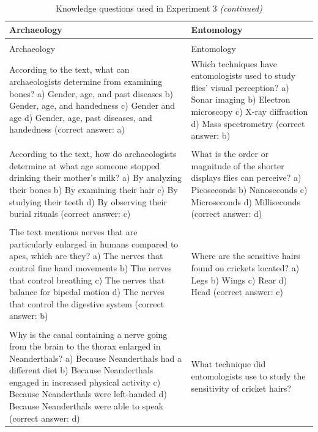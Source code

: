 \documentclass[
  english,
  doc,floatsintext]{apa6}
\begin{document}
\begin{longtable}[t]{>{\raggedright\arraybackslash}p{25em}|>{\raggedright\arraybackslash}p{25em}}
\caption{\label{tab:exp2b-knowledge}Knowledge questions used in Experiment 3}\\
\toprule
Archaeology & Entomology\\
\midrule
\endfirsthead
\caption[]{\label{tab:exp2b-knowledge}Knowledge questions used in Experiment 3 \textit{(continued)}}\\
\toprule
Archaeology & Entomology\\
\midrule
\endhead

\endfoot
\bottomrule
\endlastfoot
According to the text, what can archaeologists determine from examining bones? 
a) Gender, age, and past diseases 
b) Gender, age, and handedness
c) Gender and age
d) Gender, age, past diseases, and handedness
(correct answer: a) & Which techniques have entomologists used to study flies' visual perception?
a) Sonar imaging
b) Electron microscopy 
c) X-ray diffraction 
d) Mass spectrometry
(correct answer: b)\\
 \vphantom{3} \vphantom{2} \vphantom{1} & \\
According to the text, how do archaeologists determine at what age someone stopped drinking their mother’s milk?
a) By analyzing their bones 
b) By examining their hair 
c) By studying their teeth 
d) By observing their burial rituals
(correct answer: c) & What is the order or magnitude of the shorter displays flies can perceive?
a) Picoseconds
b) Nanoseconds
c) Microseconds
d) Milliseconds
(correct answer: d)\\
 & \\
The text mentions nerves that are particularly enlarged in humans compared to apes, which are they? 
a) The nerves that control fine hand movements
b) The nerves that control breathing
c) The nerves that balance for bipedal motion
d) The nerves that control the digestive system
(correct answer: b) & Where are the sensitive hairs found on crickets located?
a) Legs  
b) Wings  
c) Rear  
d) Head  
(correct answer: \vphantom{1} c)\\
\addlinespace
 & \\
Why is the canal containing a nerve going from the brain to the thorax enlarged in Neanderthals? 
a) Because Neanderthals had a different diet
b) Because Neanderthals engaged in increased physical activity 
c) Because Neanderthals were left-handed 
d) Because Neanderthals were able to speak
(correct answer: d) & What technique did entomologists use to study the sensitivity of cricket hairs?

\end{longtable}
\end{document}
